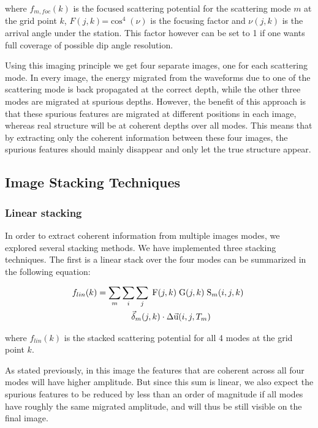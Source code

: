\documentclass[9pt,a4paper]{article}
\numberwithin{equation}{section}
\begin{document}
\begin{multicols}{2}
\noindent where $f_{m,foc}(k)$ is the focused scattering potential for the scattering mode $m$ at the grid point $k$, $F(j,k)$=$\cos^4(\nu)$ is the focusing factor and $\nu(j,k)$ is the arrival angle under the station.
This factor however can be set to 1 if one wants full coverage of possible dip angle resolution.

Using this imaging principle we get four separate images, one for each scattering mode.
In every image, the energy migrated from the waveforms due to one of the scattering mode is back propagated at the correct depth, while the other three modes are migrated at spurious depths.
However, the benefit of this approach is that these spurious features are migrated at different positions in each image, whereas real structure will be at coherent depths over all modes.
This means that by extracting only the coherent information between these four images, the spurious features should mainly disappear and only let the true structure appear.

\subsection{Image Stacking Techniques}

\subsubsection{Linear stacking}

In order to extract coherent information from multiple images modes, we explored several stacking methods.
We have implemented three stacking techniques.
The first is a linear stack over the four modes can be summarized in the following equation:

\begin{align}
  f_{lin}(k) &= \sum_m \sum_i \sum_j \; \text{F}(j,k) \; \text{G}(j,k) \; \text{S}_{m}(i,j,k) \; \notag\\&\qquad\qquad \vec{\delta}_{m}(j,k) \cdot \Delta\vec{\text{u}}(i,j,T_m)
  \label{lin}
\end{align}
\vspace{1mm}

\noindent where $f_{lin}(k)$ is the stacked scattering potential for all 4 modes at the grid point $k$. 

As stated previously, in this image the features that are coherent across all four modes will have higher amplitude.
But since this sum is linear, we also expect the spurious features to be reduced by less than an order of magnitude if all modes have roughly the same migrated amplitude, and will thus be still visible on the final image.


\end{multicols}
\end{document}
